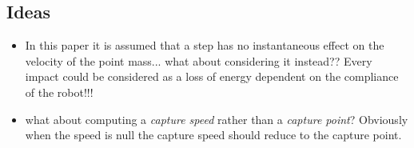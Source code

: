\subsection*{Ideas}

\begin{itemize}
\item In this paper it is assumed that a step has no instantaneous effect
on the velocity of the point mass... what about considering it instead?? Every impact could be considered as a loss of energy dependent on the compliance of the robot!!!

\item what about computing a \textit{capture speed} rather than a \textit{capture point}? Obviously when the speed is null the capture speed should reduce to the capture point.
\end{itemize}